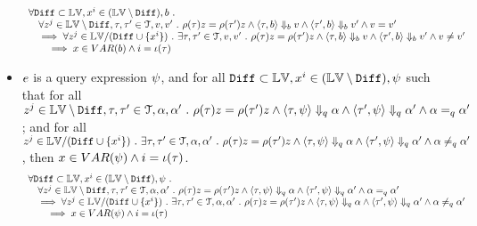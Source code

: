 \begin{lem}
\begin{itemize}
\[\begin{array}{l}
		\forall \mathtt{Diff} \subset \mathbb{LV},  x^i \in (\mathbb{LV} \setminus \mathtt{Diff}), b ~.~
		\\ \quad
		\forall z^j \in \mathbb{LV} \setminus \mathtt{Diff}, \mathtt{\tau}, \mathtt{\tau}' \in \mathcal{T}, v, v' ~.~ 
		\rho(\mathtt{\tau}) z = \rho(\mathtt{\tau}') z \land 
		\langle \mathtt{\tau}, b \rangle \Downarrow_b v \land \langle \mathtt{\tau}', b \rangle \Downarrow_b v' \land v = v'
		\\ \quad
		\implies 
		\forall z^j \in \mathbb{LV} / (\mathtt{Diff} \cup \{x^i\} ) ~.~ 
		 \exists \mathtt{\tau}, \mathtt{\tau}' \in \mathcal{T}, v, v'~.~ 
		\rho(\mathtt{\tau}) z = \rho(\mathtt{\tau}') z \land 
		\langle \mathtt{\tau}, b \rangle \Downarrow_b v \land \langle \mathtt{\tau}', b \rangle \Downarrow_b v' \land v \neq v'
		\\ \qquad
		\implies x \in VAR(b) \land i = \iota(\mathtt{\tau})
		\end{array}
	\]
% 
	\item $e$ is a query expression $\psi$,
	and for all $\mathtt{Diff} \subset \mathbb{LV},  x^i \in (\mathbb{LV} \setminus \mathtt{Diff}), \psi$ such that 
	for all $ z^j \in \mathbb{LV} \setminus \mathtt{Diff}, \mathtt{\tau}, \mathtt{\tau}' \in \mathcal{T}, \alpha, \alpha' ~.~ 
 \rho(\mathtt{\tau}) z = \rho(\mathtt{\tau}') z \land 
 \langle \mathtt{\tau}, \psi \rangle \Downarrow_q \alpha \land \langle \mathtt{\tau}', \psi \rangle \Downarrow_q \alpha' \land \alpha =_q \alpha'$;
 and for all 
	$ z^j \in \mathbb{LV} / (\mathtt{Diff} \cup \{x^i\} ) ~.~ 
  \exists \mathtt{\tau}, \mathtt{\tau}' \in \mathcal{T}, \alpha, \alpha'~.~ 
 \rho(\mathtt{\tau}) z = \rho(\mathtt{\tau}') z \land 
 \langle \mathtt{\tau}, \psi \rangle \Downarrow_q \alpha \land \langle \mathtt{\tau}', \psi \rangle \Downarrow_q \alpha' \land \alpha \neq_{q} \alpha'$,
 then  $x \in VAR(\psi) \land i = \iota(\mathtt{\tau})$.
	\[
		\begin{array}{l}
		\forall \mathtt{Diff} \subset \mathbb{LV},  x^i \in (\mathbb{LV} \setminus \mathtt{Diff}), \psi ~.~
		\\ \quad
		\forall z^j \in \mathbb{LV} \setminus \mathtt{Diff}, \mathtt{\tau}, \mathtt{\tau}' \in \mathcal{T}, \alpha, \alpha' ~.~ 
		\rho(\mathtt{\tau}) z = \rho(\mathtt{\tau}') z \land 
		\langle \mathtt{\tau}, \psi \rangle \Downarrow_q \alpha \land \langle \mathtt{\tau}', \psi \rangle \Downarrow_q \alpha' \land \alpha =_q \alpha'
		\\ \quad
		\implies 
		\forall z^j \in \mathbb{LV} / (\mathtt{Diff} \cup \{x^i\} ) ~.~ 
		 \exists \mathtt{\tau}, \mathtt{\tau}' \in \mathcal{T}, \alpha, \alpha'~.~ 
		\rho(\mathtt{\tau}) z = \rho(\mathtt{\tau}') z \land 
		\langle \mathtt{\tau}, \psi \rangle \Downarrow_q \alpha \land \langle \mathtt{\tau}', \psi \rangle \Downarrow_q \alpha' \land \alpha \neq_{q} \alpha'
		\\ \qquad
		\implies x \in VAR(\psi) \land i = \iota(\mathtt{\tau})
		\end{array}
	\]
	\end{itemize}
	\end{lem}
